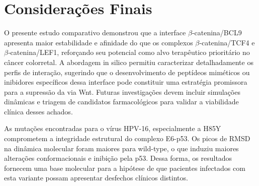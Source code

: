 \chapter{Considerações Finais}

O presente estudo comparativo demonstrou que a interface $\beta$‑catenina/BCL9 apresenta
maior estabilidade e afinidade do que os complexos $\beta$‑catenina/TCF4 e $\beta$‑catenina/LEF1,
reforçando seu potencial como alvo terapêutico prioritário no câncer colorretal. A
abordagem in silico permitiu caracterizar detalhadamente os perfis de interação, sugerindo
que o desenvolvimento de peptídeos miméticos ou inibidores específicos dessa interface
pode constituir uma estratégia promissora para a supressão da via Wnt. Futuras
investigações devem incluir simulações dinâmicas e triagem de candidatos farmacológicos
para validar a viabilidade clínica desses achados.

As mutações encontradas para o vírus HPV-16, especialmente a H85Y comprometem a integridade estrutural do complexo E6-p53. Os picos de RMSD na dinâmica molecular foram maiores para wild-type, o que induziu maiores alterações conformacionais e inibição pela p53. Dessa forma, os resultados fornecem uma base molecular para a hipótese de que pacientes infectados com esta variante possam apresentar desfechos clínicos distintos. 


